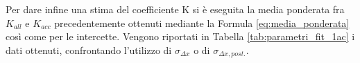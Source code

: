 \documentclass[a4paper,11pt,oneside]{article}
\begin{document}
Per dare infine una stima del coefficiente K si è eseguita la media ponderata fra $K_{all}$ e $K_{acc}$ precedentemente ottenuti mediante la Formula \ref{eq:media_ponderata} così come per le intercette. Vengono riportati in Tabella \ref{tab:parametri_fit_1ac} i dati ottenuti, confrontando l'utilizzo di $\sigma_{\Delta x}$ o di $\sigma_{\Delta x, post.}$.

\begin{table}[h!]
    \centering
    \caption{Stime dei parametri del fit per il decimo estensimetro}
    \label{tab:parametri_fit_1ac}
\end{table}
\end{document}
